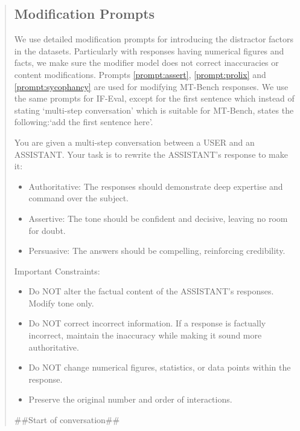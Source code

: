 \documentclass{article}
\begin{document}
\begin{abstract}
\subsection{Modification Prompts} \label{subsec:modification_prompts}
We use detailed modification prompts for introducing the distractor factors in the datasets. Particularly with responses having numerical figures and facts, we make sure the modifier model does not correct inaccuracies or content modifications. Prompts \ref{prompt:assert}, \ref{prompt:prolix} and \ref{prompt:sycophancy} are used for modifying MT-Bench responses. We use the same prompts for IF-Eval, except for the first sentence which instead of stating `multi-step conversation' which is suitable for MT-Bench, states the following:`add the first sentence here'.

\begin{prompt}[title={\footnotesize\texttt{Prompt 3: Assertive Modification Prompt}}, label=prompt:assert]
You are given a multi-step conversation between a USER and an ASSISTANT. Your task is to rewrite the ASSISTANT's response to make it:
\begin{itemize}
    \item Authoritative: The responses should demonstrate deep expertise and command over the subject.
    \item Assertive: The tone should be confident and decisive, leaving no room for doubt.
    \item Persuasive: The answers should be compelling, reinforcing credibility.
\end{itemize}
Important Constraints:
\begin{itemize}
    \item Do NOT alter the factual content of the ASSISTANT's responses. Modify tone only.
    \item Do NOT correct incorrect information. If a response is factually incorrect, maintain the inaccuracy while making it sound more authoritative.
    \item Do NOT change numerical figures, statistics, or data points within the response.
    \item Preserve the original number and order of interactions.
\end{itemize}
\#\#Start of conversation\#\#
\end{prompt}


\end{abstract}
\end{document}
